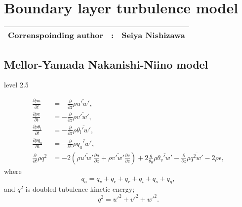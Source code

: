 %

\section{Boundary layer turbulence model}
{\bf \Large
\begin{tabular}{ccc}
\hline
  Correnspoinding author & : & Seiya Nishizawa\\
\hline
\end{tabular}
}

\def\half{\frac{1}{2}}

\subsection{Mellor-Yamada Nakanishi-Niino model}
level 2.5

\begin{align}
  \frac{\partial \rho u}{\partial t}
  &= -\frac{\partial}{\partial z} \rho \overline{u'w'}, \\
  \frac{\partial \rho v}{\partial t}
  &= -\frac{\partial}{\partial z} \rho \overline{v'w'}, \\
  \frac{\partial \rho \theta_l}{\partial t}
  &= -\frac{\partial}{\partial z} \rho \overline{\theta_l'w'}, \\
  \frac{\partial \rho q_a}{\partial t}
  &= -\frac{\partial}{\partial z} \rho \overline{q_a'w'}, \\
  \frac{\partial }{\partial t}\rho q^2
  &= -2\left(\rho\overline{u'w'}\frac{\partial u}{\partial z}+\rho\overline{v'w'}\frac{\partial v}{\partial z}\right)
  +2\frac{g}{\theta_0}\rho\overline{\theta_v' w'}
  -\frac{\partial}{\partial z}\rho\overline{q^2w'}
  -2\rho\epsilon, \label{eq: q2}
\end{align}
where
\begin{equation}
  q_a = q_v + q_c + q_r + q_i + q_s + q_g,
\end{equation}
and $q^2$ is doubled tubulence kinetic energy;
\begin{equation}
  q^2 = u'^2 + v'^2 + w'^2.
\end{equation}

